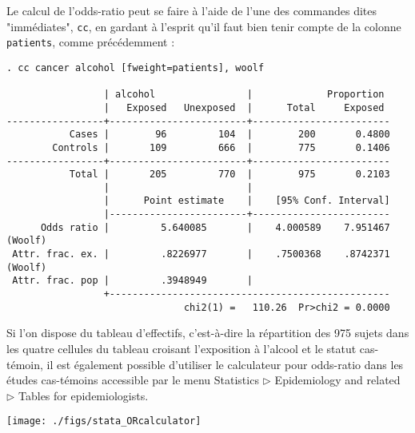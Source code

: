 Le calcul de l'odds-ratio peut se faire à l'aide de l'une des commandes
\Stata dites "immédiates", \texttt{cc}, en gardant à l'esprit qu'il faut bien
tenir compte de la colonne \texttt{patients}, comme précédemment :
\begin{verbatim}
. cc cancer alcohol [fweight=patients], woolf

                 | alcohol                |             Proportion
                 |   Exposed   Unexposed  |      Total     Exposed
-----------------+------------------------+------------------------
           Cases |        96         104  |        200       0.4800
        Controls |       109         666  |        775       0.1406
-----------------+------------------------+------------------------
           Total |       205         770  |        975       0.2103
                 |                        |
                 |      Point estimate    |    [95% Conf. Interval]
                 |------------------------+------------------------
      Odds ratio |         5.640085       |    4.000589    7.951467 (Woolf)
 Attr. frac. ex. |         .8226977       |    .7500368    .8742371 (Woolf)
 Attr. frac. pop |         .3948949       |
                 +-------------------------------------------------
                               chi2(1) =   110.26  Pr>chi2 = 0.0000
\end{verbatim}

Si l'on dispose du tableau d'effectifs, c'est-à-dire la répartition des 975
sujets dans les quatre cellules du tableau croisant l'exposition à l'alcool
et le statut cas-témoin, il est également possible d'utiliser le calculateur
pour odds-ratio dans les études cas-témoins accessible par le menu
\textsf{Statistics} $\rhd$ \textsf{Epidemiology and related} $\rhd$
\textsf{Tables for epidemiologists}.

\texttt{[image: ./figs/stata\_ORcalculator]}


